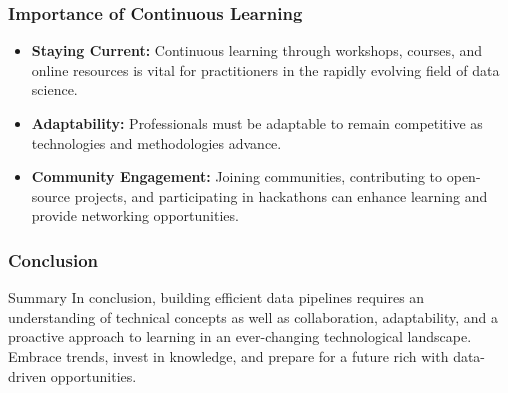 \documentclass{beamer}
\begin{document}
\begin{frame}[fragile]
    \frametitle{Importance of Continuous Learning}
    \begin{itemize}
        \item \textbf{Staying Current:} Continuous learning through workshops, courses, and online resources is vital for practitioners in the rapidly evolving field of data science.
        
        \item \textbf{Adaptability:} Professionals must be adaptable to remain competitive as technologies and methodologies advance.
        
        \item \textbf{Community Engagement:} Joining communities, contributing to open-source projects, and participating in hackathons can enhance learning and provide networking opportunities.
    \end{itemize}
\end{frame}

\begin{frame}[fragile]
    \frametitle{Conclusion}
    \begin{block}{Summary}
        In conclusion, building efficient data pipelines requires an understanding of technical concepts as well as collaboration, adaptability, and a proactive approach to learning in an ever-changing technological landscape. Embrace trends, invest in knowledge, and prepare for a future rich with data-driven opportunities.
    \end{block}
\end{frame}
\end{document}
